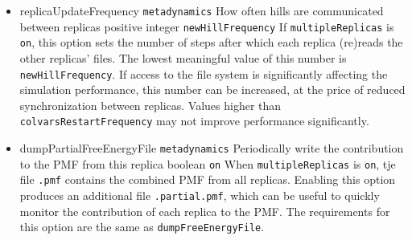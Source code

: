 \begin{itemize}
\item %
  \keydef
    {replicaUpdateFrequency}{%
    \texttt{metadynamics}}{%
    How often hills are communicated between
    replicas}{%
    positive integer}{%
    \texttt{newHillFrequency}}{%
    If \texttt{multipleReplicas} is \texttt{on}, this option sets the
    number of steps after which each replica (re)reads the other
    replicas' files.  The lowest meaningful value of this number is
    \texttt{newHillFrequency}.  If access to the file system is
    significantly affecting the simulation performance, this number can
    be increased, at the price of reduced synchronization between
    replicas.  Values higher than \texttt{colvarsRestartFrequency} may
    not improve performance significantly.}

\item %
  \keydef
    {dumpPartialFreeEnergyFile}{%
    \texttt{metadynamics}}{%
    Periodically write the contribution to the
    PMF from this replica}{%
    boolean}{%
    \texttt{on}}{%
    When \texttt{multipleReplicas} is \texttt{on}, tje file
    \outputName\texttt{.pmf} contains the combined PMF from all
    replicas.  Enabling this option produces an additional file
    \outputName\texttt{.partial.pmf}, which can be useful to
    quickly monitor the contribution of each replica to the PMF.  The
    requirements for this option are the same as
    \texttt{dumpFreeEnergyFile}.}

\end{itemize}


